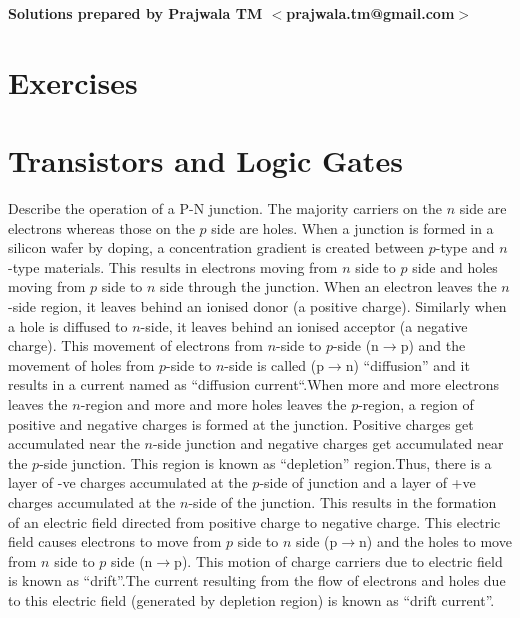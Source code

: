 \begin{flushright}
\textbf{Solutions prepared by Prajwala TM $<$prajwala.tm@gmail.com$>$}
\end{flushright}
\section*{Exercises}
\vskip 1cm

\setcounter{Exercise}{0}
\setcounter{Answer}{0}


\section*{Transistors and Logic Gates}

\begin{ExerciseList}
\Exercise
Describe the operation of a P-N junction.
\Answer
The majority carriers on the $n$ side are electrons whereas those on the $p$ side are holes. When a junction is formed in a silicon wafer by doping, a concentration gradient is created between $p$-type and $n$-type materials. This results in electrons moving from $n$ side to 
$p$ side and holes moving from $p$ side to $n$ side through the junction. When an electron leaves the $n$-side region, it leaves behind an ionised donor (a positive charge). Similarly when a hole is diffused to $n$-side, it leaves behind an ionised acceptor (a negative charge).  This movement of electrons from $n$-side to $p$-side (n$\rightarrow$p) and the movement of holes from $p$-side to $n$-side is called (p$\rightarrow$n) “diffusion” and it results in a current named as “diffusion current“.When more and more electrons leaves the $n$-region and more and more holes leaves the $p$-region, a region of positive and negative charges is formed at the junction. Positive charges get accumulated near the $n$-side junction and negative charges get accumulated near the $p$-side junction. This region is known as “depletion” region.Thus, there is a layer of -ve charges accumulated at the $p$-side of junction and a layer of +ve charges accumulated at the $n$-side of the junction. This results in the formation of an electric field directed from positive charge to negative charge. This electric field causes electrons to move from $p$ side to $n$ side (p$\rightarrow$n) and the holes to move from $n$ side to $p$ side 
(n$\rightarrow$p). This motion of charge carriers due to electric field is known as “drift”.The current resulting from the flow of electrons and holes due to this electric field (generated by depletion region) is known as “drift current”.

\end{ExerciseList}
